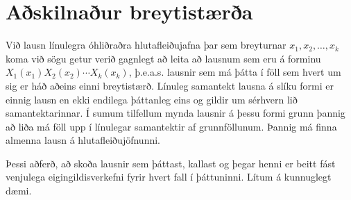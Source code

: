 \documentclass[a4paper,10pt,icelandic]{sphinxmanual}
\begin{document}
\section{Aðskilnaður breytistærða}
\label{\detokenize{Kafli03:askilnaur-breytistaera}}
Við lausn línulegra óhliðraðra hlutafleiðujafna þar sem breyturnar \(x_1,x_2,\ldots,x_k\) koma við sögu getur verið gagnlegt að leita að lausnum sem eru á forminu \(X_1(x_1)X_2(x_2)\cdots X_k(x_k)\), þ.e.a.s. lausnir sem má þátta í föll sem hvert um sig er háð aðeins einni breytistærð. Línuleg samantekt lausna á slíku formi er einnig lausn en ekki endilega þáttanleg eins og gildir um sérhvern lið samantektarinnar. Í sumum tilfellum mynda lausnir á þessu formi grunn þannig að liða má föll upp í línulegar samantektir af grunnföllunum. Þannig má finna almenna lausn á hlutafleiðujöfnunni.

Þessi aðferð, að skoða lausnir sem þáttast, kallast  og þegar henni er beitt fást venjulega eigingildisverkefni fyrir hvert fall í þáttuninni. Lítum á kunnuglegt dæmi.
\end{document}
